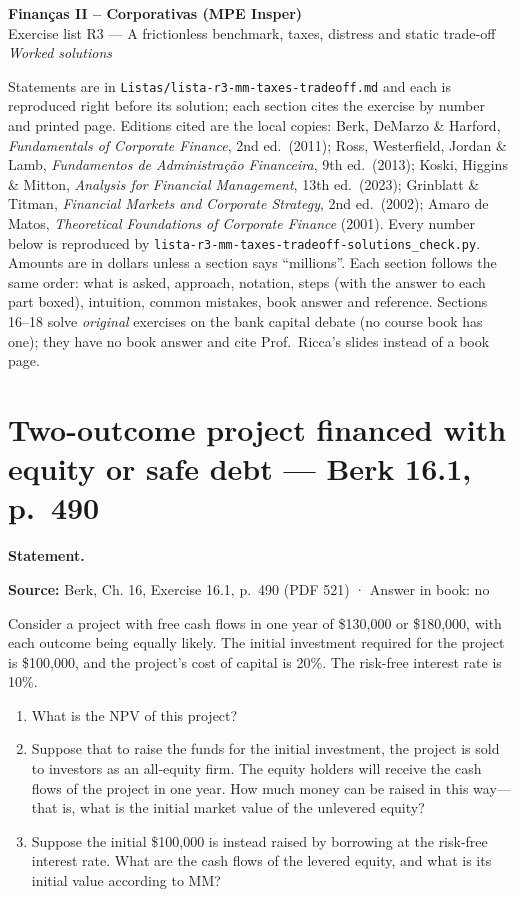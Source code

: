\documentclass[11pt,a4paper]{article}
\numberwithin{equation}{section}
\newcommand{\stmtbegin}{\par\medskip\noindent\textbf{Statement.}\par\nopagebreak\begingroup\small\setlength{\tabcolsep}{3pt}\sloppy}
\begin{document}
\begin{center}
  {\Large\bfseries Finanças II -- Corporativas (MPE Insper)}\\[3pt]
  {\large Exercise list R3 --- A frictionless benchmark, taxes, distress and static trade-off}\\[3pt]
  \textit{Worked solutions}
\end{center}

\noindent\small Statements are in \texttt{Listas/lista-r3-mm-taxes-tradeoff.md} and each is reproduced right before its solution; each section cites the exercise by number and printed page. Editions cited are the
local copies: Berk, DeMarzo \& Harford, \textit{Fundamentals of Corporate Finance}, 2nd ed.\
(2011); Ross, Westerfield, Jordan \& Lamb, \textit{Fundamentos de Administração Financeira},
9th ed.\ (2013); Koski, Higgins \& Mitton, \textit{Analysis for Financial Management}, 13th
ed.\ (2023); Grinblatt \& Titman, \textit{Financial Markets and Corporate Strategy}, 2nd ed.\
(2002); Amaro de Matos, \textit{Theoretical Foundations of Corporate Finance} (2001). Every
number below is reproduced by \texttt{lista-r3-mm-taxes-tradeoff-solutions\_check.py}.
Amounts are in dollars unless a section says ``millions''. Each section follows the same order:
what is asked, approach, notation, steps (with the answer to each part boxed), intuition, common
mistakes, book answer and reference. Sections 16--18 solve \emph{original} exercises on the bank
capital debate (no course book has one); they have no book answer and cite Prof.~Ricca's slides
instead of a book page.\normalsize

\section{Two-outcome project financed with equity or safe debt --- Berk 16.1, p.~490}
\stmtbegin
\textbf{Source:} Berk, Ch. 16, Exercise 16.1, p.~490 (PDF 521) · Answer in book: no

Consider a project with free cash flows in one year of \$130,000 or \$180,000, with each outcome
being equally likely. The initial investment required for the project is \$100,000, and the
project's cost of capital is 20\%. The risk-free interest rate is 10\%.

\begin{enumerate}
\def\labelenumi{\alph{enumi}.}
\item
  What is the NPV of this project?
\item
  Suppose that to raise the funds for the initial investment, the project is sold to investors as an
  all-equity firm. The equity holders will receive the cash flows of the project in one year. How
  much money can be raised in this way---that is, what is the initial market value of the unlevered
  equity?
\item
  Suppose the initial \$100,000 is instead raised by borrowing at the risk-free interest rate. What
  are the cash flows of the levered equity, and what is its initial value according to MM?
\end{enumerate}
\end{document}
